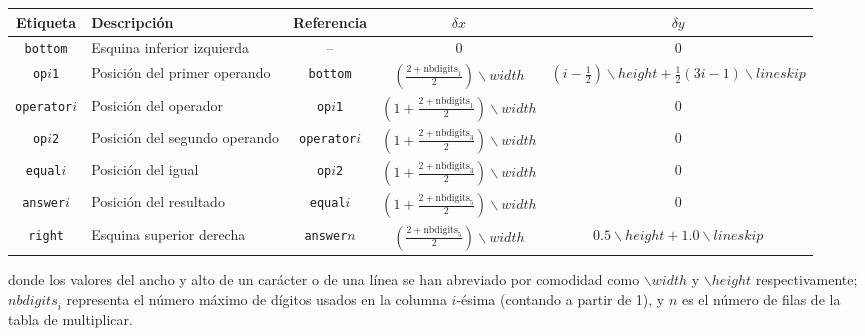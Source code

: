 \documentclass[svgnames,addpoints]{exam}
\begin{document}
\begin{center}
  \begin{tabular}{c|p{2.0cm}|c|c|c}
    Etiqueta & Descripción & Referencia & $\delta x$ & $\delta y$ \\ \toprule
    \texttt{bottom} & Esquina inferior izquierda & -- & 0 & 0 \\ \midrule
    \texttt{op}$i$\texttt{1} & Posición del primer operando & \texttt{bottom}&  $\left(\frac{2+\textrm{nbdigits}_{1}}{2}\right)\backslash\mathit{width}$ &
                                       $(i-\frac{1}{2})\backslash\mathit{height} + \frac{1}{2}(3i - 1)\backslash lineskip$ \\  \midrule
    \texttt{operator}$i$ & Posición del operador & \texttt{op}$i$\texttt{1} & $\left(1+\frac{2+\textrm{nbdigits}_{1}}{2}\right)\backslash\mathit{width}$ & 0 \\  \midrule
    \texttt{op}$i$\texttt{2} & Posición del segundo operando & \texttt{operator}$i$ & $\left(1+\frac{2+\textrm{nbdigits}_{3}}{2}\right)\backslash\mathit{width}$ & 0 \\  \midrule
    \texttt{equal}$i$ & Posición del igual & \texttt{op}$i$\texttt{2} & $\left(1+\frac{2+\textrm{nbdigits}_{3}}{2}\right)\backslash\mathit{width}$ & 0 \\  \midrule
    \texttt{answer}$i$ & Posición del resultado & \texttt{equal}$i$ & $\left(1+\frac{2+\textrm{nbdigits}_{5}}{2}\right)\backslash\mathit{width}$ & 0 \\  \midrule
    \texttt{right} & Esquina superior derecha & \texttt{answer}$n$ & $\left(\frac{2+\textrm{nbdigits}_{5}}{2}\right)\backslash\mathit{width}$ & $0.5\backslash\mathit{height}+1.0\backslash lineskip$ \\ \bottomrule
  \end{tabular}
\end{center}

\noindent
donde los valores del ancho y alto de un carácter o de una línea se han
abreviado por comodidad como $\backslash\mathit{width}$ y
$\backslash\mathit{height}$ respectivamente; $\mathit{nbdigits}_{i}$ representa
el número máximo de dígitos usados en la columna $i$-ésima (contando a partir de
1), y $n$ es el número de filas de la tabla de multiplicar.
\end{document}
